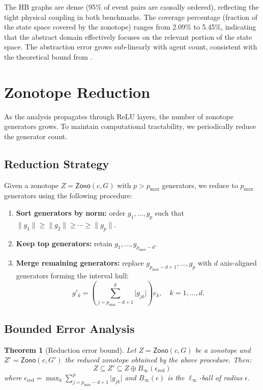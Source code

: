 \documentclass[11pt]{article}
\newtheorem{theorem}{Theorem}[section]
\newcommand{\abs}[1]{\lvert #1 \rvert}
\newcommand{\norm}[1]{\lVert #1 \rVert}
\newcommand{\zo}{\mathsf{Zono}}
\begin{document}
The HB graphs are dense (95\% of event pairs are causally ordered),
reflecting the tight physical coupling in both benchmarks. The coverage
percentage (fraction of the state space covered by the zonotope) ranges
from 2.09\% to 5.45\%, indicating that the abstract domain effectively
focuses on the relevant portion of the state space. The abstraction error
grows sub-linearly with agent count, consistent with the theoretical
bound from .


\section{Zonotope Reduction}
\label{app:reduction}

As the analysis propagates through ReLU layers, the number of zonotope
generators grows. To maintain computational tractability, we periodically
reduce the generator count.

\subsection{Reduction Strategy}

Given a zonotope $Z = \zo(c, G)$ with $p > p_{\max}$ generators, we
reduce to $p_{\max}$ generators using the following procedure:

\begin{enumerate}[nosep]
\item \textbf{Sort generators by norm:} order $g_1, \ldots, g_p$ such that
$\norm{g_1} \geq \norm{g_2} \geq \cdots \geq \norm{g_p}$.
\item \textbf{Keep top generators:} retain $g_1, \ldots, g_{p_{\max}-d}$.
\item \textbf{Merge remaining generators:} replace $g_{p_{\max}-d+1}, \ldots, g_p$
with $d$ axis-aligned generators forming the interval hull:
\[
  g'_k = \left(\sum_{j=p_{\max}-d+1}^{p} \abs{g_{jk}}\right) e_k,
  \quad k = 1, \ldots, d.
\]
\end{enumerate}

\subsection{Bounded Error Analysis}

\begin{theorem}[Reduction error bound]
\label{thm:reduction-error}
Let $Z = \zo(c, G)$ be a zonotope and $Z' = \zo(c, G')$ the reduced zonotope
obtained by the above procedure. Then:
\[
  Z \subseteq Z' \subseteq Z \oplus B_\infty(\epsilon_{\text{red}})
\]
where $\epsilon_{\text{red}} = \max_{k} \sum_{j=p_{\max}-d+1}^{p} \abs{g_{jk}}$
and $B_\infty(\epsilon)$ is the $\ell_\infty$-ball of radius $\epsilon$.
\end{theorem}
\end{document}
